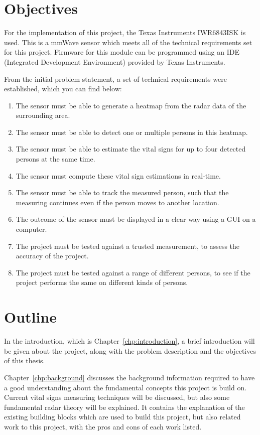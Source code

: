 \section{Objectives}
\label{sec:objectives}
For the implementation of this project, the Texas Instruments IWR6843ISK is used. This is a mmWave sensor which meets all of the technical requirements set for this project. Firmware for this module can be programmed using an IDE (Integrated Development Environment) provided by Texas Instruments.

From the initial problem statement, a set of technical requirements were established, which you can find below:

\begin{enumerate}
    \item The sensor must be able to generate a heatmap from the radar data of the surrounding area.
    \item The sensor must be able to detect one or multiple persons in this heatmap.
    \item The sensor must be able to estimate the vital signs for up to four detected persons at the same time.
    \item The sensor must compute these vital sign estimations in real-time.
    \item The sensor must be able to track the measured person, such that the measuring continues even if the person moves to another location.
    \item The outcome of the sensor must be displayed in a clear way using a GUI on a computer.
    \item The project must be tested against a trusted measurement, to assess the accuracy of the project.
    \item The project must be tested against a range of different persons, to see if the project performs the same on different kinds of persons.
\end{enumerate}

\section{Outline}
In the introduction, which is Chapter~\ref{chp:introduction}, a brief introduction will be given about the project, along with the problem description and the objectives of this thesis.

Chapter~\ref{chp:background} discusses the background information required to have a good understanding about the fundamental concepts this project is build on. Current vital signs measuring techniques will be discussed, but also some fundamental radar theory will be explained. It contains the explanation of the existing building blocks which are used to build this project, but also related work to this project, with the pros and cons of each work listed.

